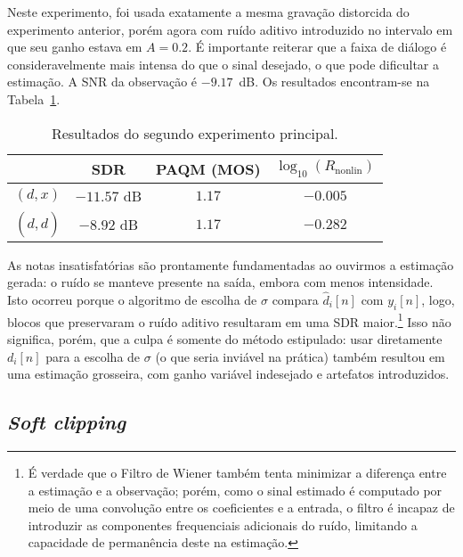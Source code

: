 Neste experimento, foi usada exatamente a mesma gravação distorcida do experimento anterior, porém agora com ruído aditivo introduzido no intervalo em que seu ganho estava em $A = 0.2$. É importante reiterar que a faixa de diálogo é consideravelmente mais intensa do que o sinal desejado, o que pode dificultar a estimação. A SNR da observação é $-9.17$~dB. Os resultados encontram-se na Tabela~\ref{tab:correntropy:experiment-2}.
{\def\arraystretch{1.25}\tabcolsep=10pt
\begin{table}[!ht]
    \centering
    \caption[Resultados do segundo experimento: \textit{fades} com ruído aditivo]{Resultados do segundo experimento principal.}
    \label{tab:correntropy:experiment-2}
    \begin{tabular}{cccc}
        \toprule
                         & SDR        & PAQM (MOS)   & $\log_{10}(R_{\text{nonlin}})$ \\
        \midrule
        $(d, x)$       &  $-11.57$ dB &  $1.17$ & $-0.005$          \\
        $(d, \hat{d})$ &  $-8.92$ dB & $1.17$   &  $-0.282$              \\ \bottomrule
    \end{tabular}
\end{table}
}

As notas insatisfatórias são prontamente fundamentadas ao ouvirmos a estimação gerada: o ruído se manteve presente na saída, embora com menos intensidade. Isto ocorreu porque o algoritmo de escolha de $\sigma$ compara $\hat{d}_i[n]$ com $y_i[n]$, logo, blocos que preservaram o ruído aditivo resultaram em uma SDR maior.\footnote{É verdade que o Filtro de Wiener também tenta minimizar a diferença entre a estimação e a observação; porém, como o sinal estimado é computado por meio de uma convolução entre os coeficientes e a entrada, o filtro é incapaz de introduzir as componentes frequenciais adicionais do ruído, limitando a capacidade de permanência deste na estimação.} Isso não significa, porém, que a culpa é somente do método estipulado: usar diretamente $d_i[n]$ para a escolha de $\sigma$ (o que seria inviável na prática) também resultou em uma estimação grosseira, com ganho variável indesejado e artefatos introduzidos.

\subsection{\textit{Soft clipping}}

